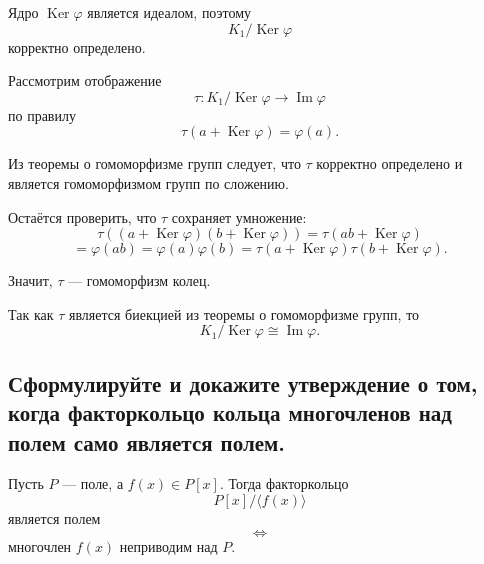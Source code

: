 \begin{Proof}
    Ядро $\operatorname{Ker}\varphi$ является идеалом, поэтому
    \[
        K_1 / \operatorname{Ker}\varphi
    \]
    корректно определено.

    Рассмотрим отображение
    \[
        \tau: K_1 / \operatorname{Ker}\varphi \to \operatorname{Im}\varphi
    \]
    по правилу
    \[
        \tau(a + \operatorname{Ker}\varphi) = \varphi(a).
    \]

    Из теоремы о гомоморфизме групп следует, что $\tau$ корректно определено и является гомоморфизмом групп по сложению.

    Остаётся проверить, что $\tau$ сохраняет умножение:
    \[
        \tau((a + \operatorname{Ker}\varphi)(b + \operatorname{Ker}\varphi))
        =
        \tau(ab + \operatorname{Ker}\varphi)
    \]
    \[
        =
        \varphi(ab)
        =
        \varphi(a)\varphi(b)
        =
        \tau(a + \operatorname{Ker}\varphi)\tau(b + \operatorname{Ker}\varphi).
    \]

    Значит, $\tau$ --- гомоморфизм колец.

    Так как $\tau$ является биекцией из теоремы о гомоморфизме групп, то
    \[
        K_1 / \operatorname{Ker}\varphi \cong \operatorname{Im}\varphi.
    \]
\end{Proof}

\subsection{Сформулируйте и докажите утверждение о том, когда факторкольцо кольца многочленов над полем само является полем.}
\begin{theorem}
    Пусть $P$ --- поле, а $f(x) \in P[x]$. Тогда факторкольцо
    \[
        P[x]/\langle f(x) \rangle
    \]
    является полем
    \[
        \Longleftrightarrow
    \]
    многочлен $f(x)$ неприводим над $P$.
\end{theorem}

